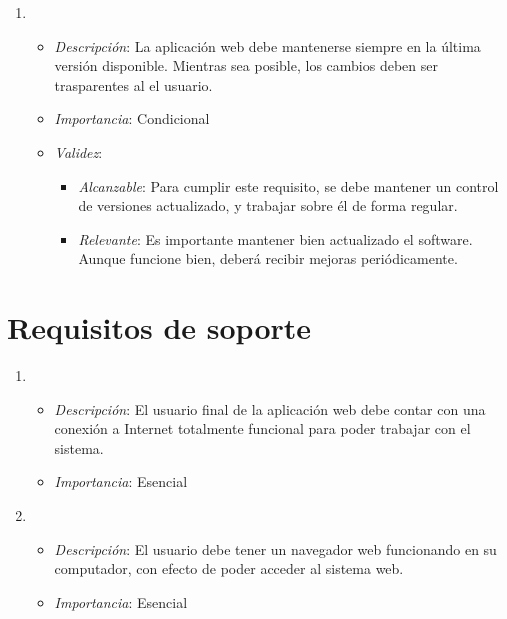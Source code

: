 \begin{enumerate}[{\bf EV-1}]
\item 
  \begin{itemize}
  \item \textit{Descripción}: La aplicación web debe mantenerse siempre en la última versión disponible. Mientras sea posible, los cambios deben ser trasparentes al el usuario.
  \item \textit{Importancia}: Condicional
  \item \textit{Validez}:

    \begin{itemize}
    \item \textit{Alcanzable}: Para cumplir este requisito, se debe mantener un control de versiones actualizado, y trabajar sobre él de forma regular.
    \item \textit{Relevante}: Es importante mantener bien actualizado el software. Aunque funcione bien, deberá recibir mejoras periódicamente.
    \end{itemize}

  \end{itemize}

\end{enumerate}

\section{Requisitos de soporte}

\begin{enumerate}[{\bf SO-1}]
\item 
  \begin{itemize}
  \item \textit{Descripción}: El usuario final de la aplicación web debe contar con una conexión a Internet totalmente funcional para poder trabajar con el sistema.
  \item \textit{Importancia}: Esencial
  \end{itemize}

\item 
  \begin{itemize}
  \item \textit{Descripción}: El usuario debe tener un navegador web funcionando en su computador, con efecto de poder acceder al sistema web.
  \item \textit{Importancia}: Esencial
  \end{itemize}

\end{enumerate}
